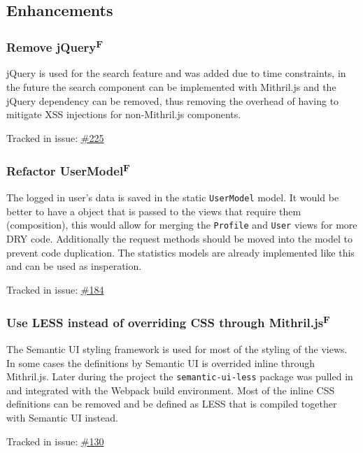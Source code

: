 \documentclass[12pt,a4paper]{report}
\begin{document}
\subsection*{Enhancements}
\subsubsection{Remove jQuery\texorpdfstring{\textsuperscript{F}}{}}
\label{subsec:remove-jquery}
jQuery is used for the search feature and was added due to time constraints, in the future the search component can be implemented with Mithril.js and the jQuery dependency can be removed, thus removing the overhead of having to mitigate XSS injections for non-Mithril.js components.

Tracked in issue: \href{https://github.com/LuleaUniversityOfTechnology/2018-project-roaster/issues/225}{\#225}

\subsubsection{Refactor UserModel\texorpdfstring{\textsuperscript{F}}{}}
The logged in user's data is saved in the static \texttt{UserModel} model. It would be better to have a object that is passed to the views that require them (composition), this would allow for merging the \texttt{Profile} and \texttt{User} views for more DRY code. Additionally the request methods should be moved into the model to prevent code duplication. The statistics models are already implemented like this and can be used as insperation.

Tracked in issue: \href{https://github.com/LuleaUniversityOfTechnology/2018-project-roaster/issues/184}{\#184}

\subsubsection{Use LESS instead of overriding CSS through Mithril.js\texorpdfstring{\textsuperscript{F}}{}}
The Semantic UI styling framework is used for most of the styling of the views. In some cases the definitions by Semantic UI is overrided inline through Mithril.js. Later during the project the \texttt{semantic-ui-less} package was pulled in and integrated with the Webpack build environment. Most of the inline CSS definitions can be removed and be defined as LESS that is compiled together with Semantic UI instead.

Tracked in issue: \href{https://github.com/LuleaUniversityOfTechnology/2018-project-roaster/issues/130}{\#130}
\end{document}
